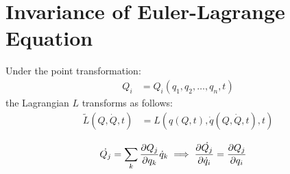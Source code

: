 \section{Invariance of Euler-Lagrange Equation}
\label{sec:invariance-euler-lagrange}
Under the point transformation:
\begin{align}
  Q_i & = Q_i(q_1, q_2, \ldots, q_n, t)
\end{align}
the Lagrangian $L$ transforms as follows:
\begin{align}
  \tilde{L} (Q, \dot{Q}, t) & = L(q(Q, t), \dot{q}(Q, \dot{Q}, t), t)
\end{align}

\begin{align}
  \dot{Q_j} & = \sum_k \pdv{Q_j}{q_k} \dot{q}_k \implies \pdv{\dot{Q_j}}{\dot{q}_i} = \pdv{Q_j}{q_i}
\end{align}

\cite{hachiware-analyticalMechanics}